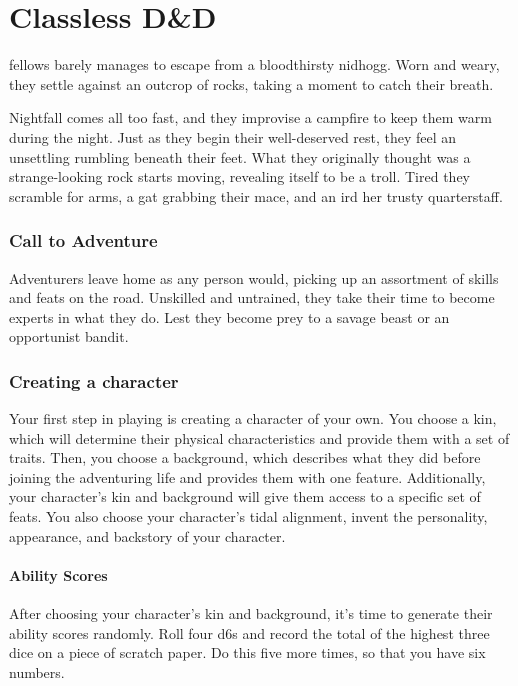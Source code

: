 \chapter{Classless D\&D} \label{ch::classlessdnd}
fellows barely manages to escape from a bloodthirsty nidhogg.
Worn and weary, they settle against an outcrop of rocks, taking a moment to catch their breath.

Nightfall comes all too fast, and they improvise a campfire to keep them warm during the night.
Just as they begin their well-deserved rest, they feel an unsettling rumbling beneath their feet.
What they originally thought was a strange-looking rock starts moving, revealing itself to be a troll.
Tired they scramble for arms, a gat grabbing their mace, and an ird her trusty quarterstaff.

\subsection*{Call to Adventure}
    Adventurers leave home as any person would, picking up an assortment of skills and feats on the road.
    Unskilled and untrained, they take their time to become experts in what they do.
    Lest they become prey to a savage beast or an opportunist bandit.

\subsection*{Creating a character}
    Your first step in playing is creating a character of your own.
    You choose a kin, which will determine their physical characteristics and provide them with a set of traits.
    Then, you choose a background, which describes what they did before joining the adventuring life and provides them with one feature.
    Additionally, your character's kin and background will give them access to a specific set of feats.
    You also choose your character's tidal alignment, invent the personality, appearance, and backstory of your character.

    \subsubsection{Ability Scores}
        After choosing your character's kin and background, it's time to generate their ability scores randomly.
        Roll four d6s and record the total of the highest three dice on a piece of scratch paper.
        Do this five more times, so that you have six numbers.

